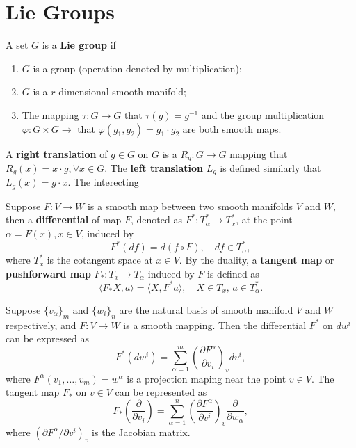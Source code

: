 \section{Lie Groups}
\begin{definition}
A set $G$ is a \textbf{Lie group} if
\begin{enumerate}
\item $G$ is a group (operation denoted by multiplication);
\item $G$ is a $r$-dimensional smooth manifold;
\item The mapping $\tau:G\to G$ that $\tau(g)=g^{-1}$ and the group multiplication $\varphi:G\times G\to$ that $\varphi(g_1,g_2)=g_1\cdot g_2$ are both smooth maps.
\end{enumerate}
A \textbf{right translation} of $g\in G$ on $G$ is a $R_g:G\to G$ mapping that $R_g(x)=x\cdot g,\forall x\in G$. The \textbf{left translation} $L_g$ is defined similarly that $L_g(x)=g\cdot x$. The interecting 
\end{definition}

\begin{definition}
Suppose $F:V\to W$ is a smooth map between two smooth manifolds $V$ and $W$, then a \textbf{differential} of map $F$, denoted as $F^*:T^*_\alpha\to T^*_x$, at the point $\alpha=F(x),x\in V$, induced by
\begin{equation}
F^*(df) = d(f\circ F),\quad df\in T_\alpha^*,
\end{equation}
where $T^*_x$ is the cotangent space at $x\in V$. By the duality, a \textbf{tangent map} or \textbf{pushforward map} $F_*:T_x\to T_\alpha$ induced by  $F$ is defined as
\begin{equation}
\langle F_*X,a\rangle=\langle X,F^*a\rangle,\quad X\in T_x,\,a\in T^*_\alpha.
\end{equation}
\end{definition}

\begin{theorem}
Suppose $\{v_\alpha\}_m$ and $\{w_i\}_n$ are the natural basis of smooth manifold $V$ and $W$ respectively, and $F:V\to W$ is a smooth mapping. Then the differential $F^*$ on $dw^i$ can be expressed as
\begin{equation}
F^*(dw^i)=\sum_{\alpha=1}^m\left(\frac{\partial F^\alpha}{\partial v_i}\right)_vdv^i,
\end{equation}
where $F^\alpha(v_1,\dots,v_m)=w^\alpha$ is a projection maping  near the point $v\in V$. The tangent map $F_*$ on $v\in V$ can be represented as 
\begin{equation}
F_*\left(\frac{\partial}{\partial v_i}\right)=\sum_{\alpha=1}^n\left(\frac{\partial F^\alpha}{\partial v^i}\right)_v\frac{\partial}{\partial w_\alpha},
\end{equation}
where $\left(\partial F^\alpha/\partial v^i\right)_v$ is the Jacobian matrix.
\end{theorem}

